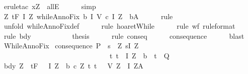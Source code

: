 \begin{isabellebody}
\ {\isacharparenleft}erule{\isacharunderscore}tac\ x{\isacharequal}Z\ \ allE{\isacharparenright}\isanewline
\ \ \ \ \isamarkupfalse%
\ simp\isanewline
\ \ \ \ \isamarkupfalse%
\isanewline
\ \ \isamarkupfalse%
\ {\isachardoublequoteopen}{\isasymforall}Z{\isachardot}\ {\isasymGamma}{\isacharcomma}{\isasymTheta}{\isasymturnstile}\isactrlsub t\isactrlbsub {\isacharslash}F\isactrlesub \ {\isacharparenleft}I\ Z{\isacharparenright}\ {\isacharparenleft}whileAnnoFix\ b\ I\ V\ c{\isacharparenright}\ {\isacharparenleft}I\ Z\ {\isasyminter}\ {\isacharminus}b{\isacharparenright}{\isacharcomma}A{\isachardoublequoteclose}\isanewline
\ \ \ \ \isamarkupfalse%
\ rule\isanewline
\ \ \ \ \isamarkupfalse%
\ {\isacharparenleft}unfold\ whileAnnoFix{\isacharunderscore}def{\isacharparenright}\isanewline
\ \ \ \ \isamarkupfalse%
\ {\isacharparenleft}rule\ hoaret{\isachardot}While{\isacharparenright}\isanewline
\ \ \ \ \isamarkupfalse%
\ {\isacharparenleft}rule\ wf\ {\isacharbrackleft}rule{\isacharunderscore}format{\isacharbrackright}{\isacharparenright}\isanewline
\ \ \ \ \isamarkupfalse%
\ {\isacharparenleft}rule\ bdy{\isacharprime}{\isacharparenright}\isanewline
\ \ \ \ \isamarkupfalse%
\isanewline
\ \ \isamarkupfalse%
\isanewline
\ \ \isamarkupfalse%
\ {\isacharquery}thesis\isanewline
\ \ \ \ \isamarkupfalse%
\ {\isacharparenleft}rule\ conseq{\isacharparenright}\isanewline
\ \ \ \ \isamarkupfalse%
\ consequence\isanewline
\ \ \ \ \isamarkupfalse%
\ blast\isanewline
{}\isamarkupfalse%
%
\endisatagproof
{\isafoldproof}%
%
\isadelimproof
\isanewline
%
\endisadelimproof
\isanewline
{}\isamarkupfalse%
\ WhileAnnoFix{\isacharprime}{\isacharcolon}\isanewline
{}\ consequence{\isacharcolon}\ {\isachardoublequoteopen}P\ {\isasymsubseteq}\ {\isacharbraceleft}s{\isachardot}\ {\isacharparenleft}{\isasymexists}\ Z{\isachardot}\ s{\isasymin}I\ Z\ {\isasymand}\ \isanewline
\ \ \ \ \ \ \ \ \ \ \ \ \ \ \ \ \ \ \ \ \ \ \ \ \ \ \ \ \ \ \ {\isacharparenleft}{\isasymforall}t{\isachardot}\ t\ {\isasymin}\ I\ Z\ {\isasyminter}\ {\isacharminus}b\ {\isasymlongrightarrow}\ t\ {\isasymin}\ Q{\isacharparenright}{\isacharparenright}\ {\isacharbraceright}{\isachardoublequoteclose}\isanewline
{}\ bdy{\isacharcolon}\ {\isachardoublequoteopen}{\isasymforall}Z\ {\isasymsigma}{\isachardot}\ {\isasymGamma}{\isacharcomma}{\isasymTheta}{\isasymturnstile}\isactrlsub t\isactrlbsub {\isacharslash}F\isactrlesub \ {\isacharparenleft}{\isacharbraceleft}{\isasymsigma}{\isacharbraceright}\ {\isasyminter}\ I\ Z\ {\isasyminter}\ b{\isacharparenright}\ {\isacharparenleft}c\ Z{\isacharparenright}\ {\isacharparenleft}{\isacharbraceleft}t{\isachardot}\ {\isacharparenleft}t{\isacharcomma}\ {\isasymsigma}{\isacharparenright}\ {\isasymin}\ V\ Z{\isacharbraceright}\ {\isasyminter}\ I\ Z{\isacharparenright}{\isacharcomma}A{\isachardoublequoteclose}\isanewline

\end{isabellebody}
